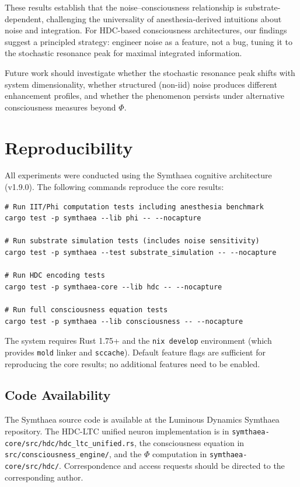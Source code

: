 \documentclass[12pt,a4paper]{article}
\begin{document}
These results establish that the noise--consciousness relationship is substrate-dependent, challenging the universality of anesthesia-derived intuitions about noise and integration. For HDC-based consciousness architectures, our findings suggest a principled strategy: engineer noise as a feature, not a bug, tuning it to the stochastic resonance peak for maximal integrated information.

Future work should investigate whether the stochastic resonance peak shifts with system dimensionality, whether structured (non-iid) noise produces different enhancement profiles, and whether the phenomenon persists under alternative consciousness measures beyond $\Phi$.

\section{Reproducibility}

All experiments were conducted using the Symthaea cognitive architecture (v1.9.0). The following commands reproduce the core results:

\begin{verbatim}
# Run IIT/Phi computation tests including anesthesia benchmark
cargo test -p symthaea --lib phi -- --nocapture

# Run substrate simulation tests (includes noise sensitivity)
cargo test -p symthaea --test substrate_simulation -- --nocapture

# Run HDC encoding tests
cargo test -p symthaea-core --lib hdc -- --nocapture

# Run full consciousness equation tests
cargo test -p symthaea --lib consciousness -- --nocapture
\end{verbatim}

The system requires Rust 1.75+ and the \texttt{nix develop} environment (which provides \texttt{mold} linker and \texttt{sccache}). Default feature flags are sufficient for reproducing the core results; no additional features need to be enabled.

\subsection*{Code Availability}

The Symthaea source code is available at the Luminous Dynamics Symthaea repository. The HDC-LTC unified neuron implementation is in \texttt{symthaea-core/src/hdc/hdc\_ltc\_unified.rs}, the consciousness equation in \texttt{src/consciousness\_engine/}, and the $\Phi$ computation in \texttt{symthaea-core/src/hdc/}. Correspondence and access requests should be directed to the corresponding author.
\end{document}
